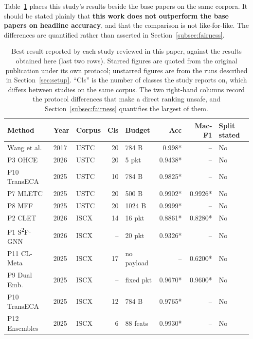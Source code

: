 \documentclass[pdflatex,sn-mathphys-num]{sn-jnl}
\theoremstyle{thmstyleone}%
\theoremstyle{thmstylethree}%
\begin{document}
Table~\ref{tab:quant} places this study's results beside the base papers on
the same corpora. It should be stated plainly that \textbf{this work does not outperform the base
papers on headline accuracy}, and that the comparison is not like-for-like.
The differences are quantified rather than asserted in
Section~\ref{subsec:fairness}.

\begin{table}[tbp]
\caption{Best result reported by each study reviewed in this paper, against
the results obtained here (last two rows). Starred figures are quoted from the
original publication under its own protocol; unstarred figures are from the
runs described in Section~\ref{sec:setup}. ``Cls'' is the number of classes the
study reports on, which differs between studies on the same corpus. The two
right-hand columns record the protocol differences that make a direct ranking
unsafe, and Section~\ref{subsec:fairness} quantifies the largest of
them.}\label{tab:quant}
\footnotesize
\begin{tabular}{@{}p{26mm}l l r p{16mm} r r p{15mm}@{}}
\toprule
Method & Year & Corpus & Cls & Budget & Acc & Mac-F1 & Split stated \\
\midrule
Wang et al.~\cite{ustc}        & 2017 & USTC & 20 & 784 B    & 0.998* & --      & No \\
P3 OHCE~\cite{p3}              & 2026 & USTC & 20 & 5 pkt    & 0.9438* & --     & No \\
P10 TransECA~\cite{p10}        & 2025 & USTC & 10 & 784 B    & 0.9825* & --     & No \\
P7 MLETC~\cite{p7}             & 2025 & USTC & 20 & 500 B    & 0.9902* & 0.9926* & No \\
P8 MFF~\cite{p8}               & 2025 & USTC & 20 & 1024 B   & 0.9999* & --     & No \\
\midrule
P2 CLET~\cite{p2}              & 2026 & ISCX & 14 & 16 pkt   & 0.8861* & 0.8280* & No \\
P1 S\textsuperscript{2}F-GNN~\cite{p1} & 2026 & ISCX & -- & 20 pkt & 0.9326* & -- & No \\
P11 CL-Meta~\cite{p11}         & 2025 & ISCX & 17 & no payload & --    & 0.6200* & No \\
P9 Dual Emb.~\cite{p9}         & 2025 & ISCX & -- & fixed pkt & 0.9670* & 0.9600* & No \\
P10 TransECA~\cite{p10}        & 2025 & ISCX & 12 & 784 B    & 0.9765* & --     & No \\
P12 Ensembles~\cite{p12}       & 2025 & ISCX &  6 & 88 feats & 0.9930* & --     & No \\

\end{tabular}
\end{table}
\end{document}
